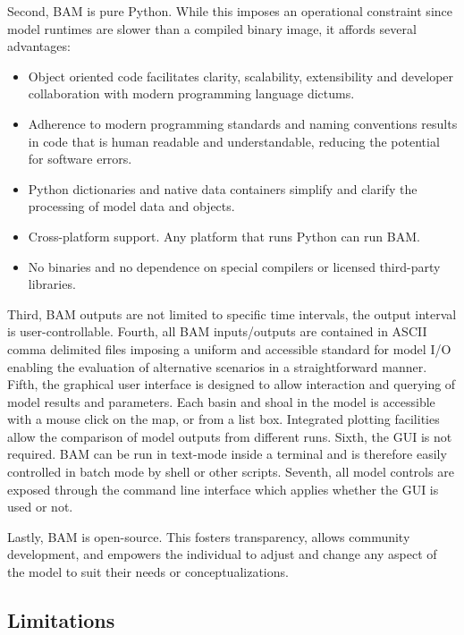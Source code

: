 Second, BAM is pure Python.  While this imposes an operational constraint since model runtimes are slower than a compiled binary image, it affords several advantages:

\renewcommand{\labelitemi}{\textendash}
\begin{itemize}  
  \itemsep-8pt
  \item Object oriented code facilitates clarity, scalability, extensibility and developer collaboration with modern programming language dictums.
  \item Adherence to modern programming standards and naming conventions results in code that is human readable and understandable, reducing the potential for software errors. 
  \item Python dictionaries and native data containers simplify and clarify the processing of model data and objects. 
  \item Cross-platform support.  Any platform that runs Python can run BAM. 
  \item No binaries and no dependence on special compilers or licensed third-party libraries. 
\end{itemize}

Third, BAM outputs are not limited to specific time intervals, the output interval is user-controllable.  Fourth, all BAM inputs/outputs are contained in ASCII comma delimited files imposing a uniform and accessible standard for model I/O enabling the evaluation of alternative scenarios in a straightforward manner.  Fifth, the graphical user interface is designed to allow interaction and querying of model results and parameters. Each basin and shoal in the model is accessible with a mouse click on the map, or from a list box.  Integrated plotting facilities allow the comparison of model outputs from different runs.  Sixth, the GUI is not required.  BAM can be run in text-mode inside a terminal and is therefore easily controlled in batch mode by shell or other scripts. Seventh, all model controls are exposed through the command line interface which applies whether the GUI is used or not. 

Lastly, BAM is open-source.  This fosters transparency, allows community development, and empowers the individual to adjust and change any aspect of the model to suit their needs or conceptualizations. 


\subsection{Limitations}
\label{sec:Limitations}

